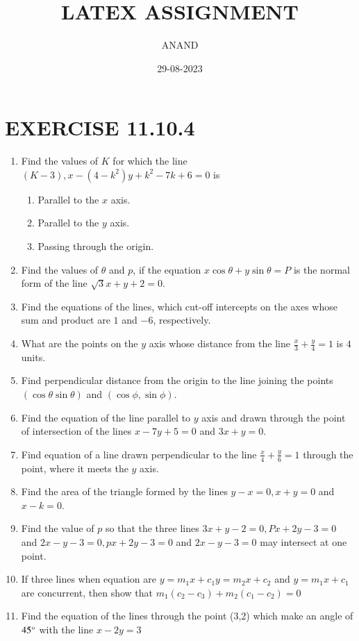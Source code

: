 \documentclass{article}
\theoremstyle{remark}
\begin{document}
\title{LATEX ASSIGNMENT}
\author{ANAND}
\date{29-08-2023}
\maketitle
\section*{EXERCISE 11.10.4}
\begin{enumerate}
\item Find the values of $K$ for which the line $(K-3), x-(4-k^2) y+k^2-7k+6=0$ is
\begin{enumerate} 
\item Parallel to the $x$ axis.
\item Parallel to the $y$ axis.
\item Passing through the origin.
\end{enumerate}
\item Find the values of $\theta$ and $p$, if the equation $x\cos \theta + y\sin \theta = P$ is the normal form of the line $\sqrt 3x+y+2=0$.
\item Find the equations of the lines, which cut-off intercepts on the axes whose sum and product are $1$ and $-6$, respectively.
\item What are the points on the $y$ axis whose distance from the line $\frac{x}{3}+\frac{y}{4}=1$ is $4$ units.
\item Find perpendicular distance from the origin to the line joining the points $(\cos \theta \sin \theta)$ and $(\cos \phi, \sin \phi)$.
\item Find the equation of the line parallel to $y$ axis and drawn through the point of intersection of the lines $x-7y+5=0$ and $3x+y=0$.
\item Find equation of a line drawn perpendicular to the line $\frac{x}{4}+\frac{y}{6}=1$ through the point, where it meets the $y$ axis.
\item Find the area of the triangle formed by the lines $y-x=0, x+y=0$ and $x-k=0$.
\item Find the value of $p$ so that the three lines $3x+y-2=0, Px+2y-3=0$ and $2x-y-3=0, px+2y-3=0$ and $2x-y-3=0$ may intersect at one point.
\item If three lines when equation are $y=m_1x+c_1y=m_2x+c_2$ and $y=m_1x+c_1$ are concurrent, then show that $m_1 (c_2-c_3)+m_2(c_1-c_2)=0$
\item Find the equation of the lines through the point (3,2) which make an angle of $45\degree$ with the line $x-2y = 3$

\end{enumerate}
\end{document}
